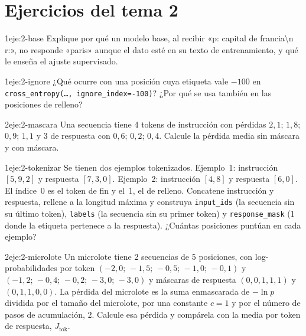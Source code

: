 \section*{Ejercicios del tema 2}

\begin{ejercicio}{1}{eje:2-base}
Explique por qué un modelo base, al recibir «p: capital de francia\textbackslash n r:», no responde «paris» aunque el dato esté en su texto de entrenamiento, y qué le enseña el ajuste supervisado.
\end{ejercicio}

\begin{ejercicio}{1}{eje:2-ignore}
¿Qué ocurre con una posición cuya etiqueta vale $-100$ en \texttt{cross\_entropy(\dots, ignore\_index=-100)}? ¿Por qué se usa también en las posiciones de relleno?
\end{ejercicio}

\begin{ejercicio}{2}{eje:2-mascara}
Una secuencia tiene 4 tokens de instrucción con pérdidas $2{,}1$; $1{,}8$; $0{,}9$; $1{,}1$ y 3 de respuesta con $0{,}6$; $0{,}2$; $0{,}4$. Calcule la pérdida media sin máscara y con máscara.
\end{ejercicio}

\begin{ejercicio}{1}{eje:2-tokenizar}
Se tienen dos ejemplos tokenizados. Ejemplo~1: instrucción $[5,9,2]$ y respuesta $[7,3,0]$. Ejemplo~2: instrucción $[4,8]$ y respuesta $[6,0]$. El índice~0 es el token de fin y el~1, el de relleno. Concatene instrucción y respuesta, rellene a la longitud máxima y construya \texttt{input\_\allowbreak ids} (la secuencia sin su último token), \texttt{labels} (la secuencia sin su primer token) y \texttt{response\_\allowbreak mask} (1 donde la etiqueta pertenece a la respuesta). ¿Cuántas posiciones puntúan en cada ejemplo?
\end{ejercicio}

\begin{ejercicio}{2}{eje:2-microlote}
Un microlote tiene 2 secuencias de 5 posiciones, con log-probabilidades por token $(-2{,}0;\,-1{,}5;\,-0{,}5;\,-1{,}0;\,-0{,}1)$ y $(-1{,}2;\,-0{,}4;\,-0{,}2;\,-3{,}0;\,-3{,}0)$ y máscaras de respuesta $(0,0,1,1,1)$ y $(0,1,1,0,0)$. La pérdida del microlote es la suma enmascarada de $-\ln p$ dividida por el tamaño del microlote, por una constante $c=1$ y por el número de pasos de acumulación, $2$. Calcule esa pérdida y compárela con la media por token de respuesta, $J_{\mathrm{tok}}$.
\end{ejercicio}

